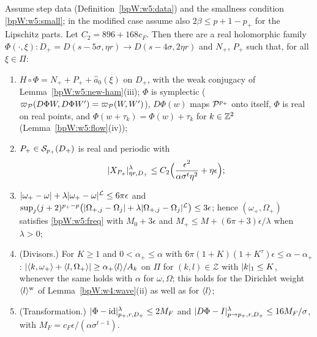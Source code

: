 \begin{theorem}\label{bpW:w5:step}
Assume step data (Definition~\ref{bpW:w5:data}) and the smallness condition \eqref{bpW:w5:small}; in the modified case
assume also $2\beta\le p+1-p_+$ for the Lipschitz parts. Let $C_2=896+168c_F$. Then there are a real holomorphic
family $\Phi(\cdot,\xi):D_+=D(s-5\sigma,\eta r)\to D(s-4\sigma,2\eta r)$ and $N_+$, $P_+$ such that, for all $\xi\in\Pi$:
\begin{enumerate}[label=(\roman*)]
\item $H\circ\Phi=N_++P_++\hat a_0(\xi)$ on $D_+$, with the weak conjugacy of Lemma~\ref{bpW:w5:new-ham}(iii);
  $\Phi$ is symplectic ($\varpi_{\mathcal P}(D\Phi W,D\Phi W')=\varpi_{\mathcal P}(W,W')$), $D\Phi(w)$ maps $\mathcal P^{p_+}$ onto itself, $\Phi$ is real on real
  points, and $\Phi(w+\tau_k)=\Phi(w)+\tau_k$ for $k\in\mathbb{Z}^2$ (Lemma~\ref{bpW:w5:flow}(iv));
\item $P_+\in\mathcal S_{p_+}(D_+)$ is real and periodic with
  \begin{equation}\label{bpW:w5:newerror}
  \lvert X_{P_+}\rvert^\lambda_{\eta r,D_+}\le C_2\Bigl(\frac{\epsilon^2}{\alpha\sigma^t\eta^2}+\eta\epsilon\Bigr);
  \end{equation}
\item $\lvert \omega_+-\omega\rvert+\lambda\lvert \omega_+-\omega\rvert^{\mathcal L}\le6\pi\epsilon$ and
  $\sup_j(j+2)^{p_+-p}\bigl(\lvert \Omega_{+,j}-\Omega_j\rvert+\lambda\lvert \Omega_{+,j}-\Omega_j\rvert^{\mathcal L}\bigr)\le3\epsilon$;
  hence $(\omega_+,\Omega_+)$ satisfies \eqref{bpW:w5:freq} with $M_0+3\epsilon$ and $M_+\le M+(6\pi+3)\epsilon/\lambda$
  when $\lambda>0$;
\item (Divisors.) For $K\ge1$ and $0<\alpha_+\le\alpha$ with $6\pi(1+K)(1+K^\tau)\epsilon\le\alpha-\alpha_+$:
  $\lvert \langle k,\omega_+\rangle+\langle l,\Omega_+\rangle\rvert\ge\alpha_+\langle l\rangle/A_k$ on $\Pi$ for $(k,l)\in\mathcal Z$ with
  $\lvert k\rvert_1\le K$, whenever the same holds with $\alpha$ for $\omega,\Omega$; this holds for the Dirichlet weight
  $\langle l\rangle^{\rm w}$ of Lemma~\ref{bpW:w4:wave}(ii) as well as for $\langle l\rangle$;
\item (Transformation.) $\lvert \Phi-\mathrm{id}\rvert^\lambda_{p_+,r,D_+}\le2M_F$ and
  $\lvert D\Phi-I\rvert^\lambda_{p\to p_+,r,D_+}\le16M_F/\sigma$, with $M_F=c_F\epsilon/(\alpha\sigma^{t-1})$.
\end{enumerate}
\end{theorem}
